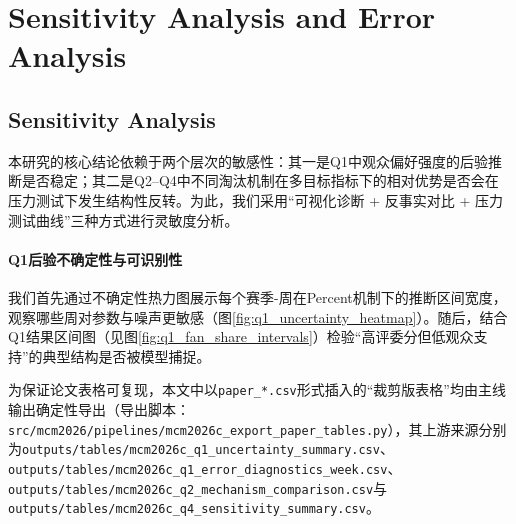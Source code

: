 \newpage
\section{Sensitivity Analysis and Error Analysis}%

\subsection{Sensitivity Analysis}

本研究的核心结论依赖于两个层次的敏感性：其一是Q1中观众偏好强度的后验推断是否稳定；其二是Q2--Q4中不同淘汰机制在多目标指标下的相对优势是否会在压力测试下发生结构性反转。为此，我们采用“可视化诊断 + 反事实对比 + 压力测试曲线”三种方式进行灵敏度分析。

\paragraph{Q1后验不确定性与可识别性}
我们首先通过不确定性热力图展示每个赛季-周在Percent机制下的推断区间宽度，观察哪些周对参数与噪声更敏感（图\ref{fig:q1_uncertainty_heatmap}）。随后，结合Q1结果区间图（见图\ref{fig:q1_fan_share_intervals}）检验“高评委分但低观众支持”的典型结构是否被模型捕捉。

为保证论文表格可复现，本文中以\texttt{paper\_*.csv}形式插入的“裁剪版表格”均由主线输出确定性导出（导出脚本：\texttt{src/mcm2026/pipelines/mcm2026c\_export\_paper\_tables.py}），其上游来源分别为\texttt{outputs/tables/mcm2026c\_q1\_uncertainty\_summary.csv}、\texttt{outputs/tables/mcm2026c\_q1\_error\_diagnostics\_week.csv}、\texttt{outputs/tables/mcm2026c\_q2\_mechanism\_comparison.csv}与\texttt{outputs/tables/mcm2026c\_q4\_sensitivity\_summary.csv}。

\begin{table}[H]
    \centering
    \caption{Q1高不确定性周：以有效样本量占比（ESS ratio）与证据强度（evidence）筛选最不稳定的周段，用于定位误差高风险输入。}
    \label{tab:q1_high_uncertainty_weeks}
\end{table}

